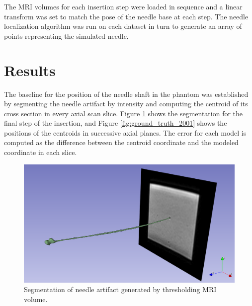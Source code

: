 The MRI volumes for each insertion step were loaded in sequence and a linear transform was set to match the pose of the needle base at each step. The needle localization algorithm was run on each dataset in turn to generate an array of points representing the simulated needle.

\section{Results}



The baseline for the position of the needle shaft in the phantom was established by segmenting the needle artifact by intensity and computing the centroid of its cross section in every axial scan slice. Figure \ref{fig:seg_2001} shows the segmentation for the final step of the insertion, and Figure \ref{fig:ground_truth_2001} shows the positions of the centroids in successive axial planes. The error for each model is computed as the difference between the centroid coordinate and the modeled coordinate in each slice.

\begin{figure}[h]
\includegraphics[width=1.0\textwidth]{Fig/chap5/segmented_artifact_2001.png}
\caption{Segmentation of needle artifact generated by thresholding MRI volume.}
\label{fig:seg_2001}
\end{figure}

